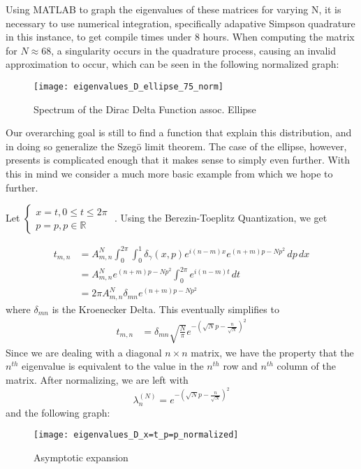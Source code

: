 \documentclass{article}
\begin{document}
Using MATLAB to graph the eigenvalues of these matrices for varying N, it is necessary to use numerical integration, specifically adapative Simpson quadrature in this instance, to get compile times under 8 hours.  When computing the matrix for $N\approx 68$, a singularity occurs in the quadrature process, causing an invalid approximation to occur, which can be seen in the following normalized graph: 
\begin{figure} [H]
\centerline{\texttt{[image: eigenvalues\_D\_ellipse\_75\_norm]}}
\caption{Spectrum of the Dirac Delta Function assoc. Ellipse}
\end{figure}

 Our overarching goal is still to find a function that explain this distribution, and in doing so generalize the Szeg\"{o} limit theorem.  The case of the ellipse, however, presents is complicated enough that it makes sense to simply even further.  With this in mind we consider a much more basic example from which we hope to further.

Let $\begin{cases} x =t, 0\le t\le 2\pi \\ p = p, p \in \mathbb{R} \end{cases}$ .  Using the Berezin-Toeplitz Quantization, we get

\begin{equation}
\begin{split}
t_{m,n} &= A_{m,n}^N\int^{2\pi}_{0} \! \int^{1}_{0}\delta_{\gamma}(x,p)e^{i(n-m)x}e^{(n+m)p-Np^{2}} \,dp \,dx \\ \nonumber
&= A_{m,n}^Ne^{(n+m)p-Np^{2}}\int_0^{2\pi}e^{i(n-m)t} \,dt \\
&= 2\pi A_{m,n}^N\delta_{mn}e^{(n+m)p-Np^{2}}
\end{split}
\end{equation} where $\delta_{mn}$ is the Kroenecker Delta.  This eventually simplifies to  \begin{equation}
\begin{split}
t_{m,n}&=\delta_{mn}\sqrt{\frac{N}{\pi}}e^{-(\sqrt{N}p-\frac{n}{\sqrt{N}})^2}
\end{split}
\end{equation} Since we are dealing with a diagonal $n\times n$ matrix, we have the property that the $n^{th}$ eigenvalue is equivalent to the value in the $n^{th}$ row and $n^{th}$ column of the matrix.  After normalizing, we are left with
\begin{equation}
\lambda_n^{(N)} = e^{-(\sqrt{N}p-\frac{n}{\sqrt{N}})^2} \label{SEXY}
\end{equation} and the following graph: \begin{figure} [H]
\centerline{\texttt{[image: eigenvalues\_D\_x=t\_p=p\_normalized]}}
\caption{Asymptotic expansion}
\end{figure}
\end{document}
